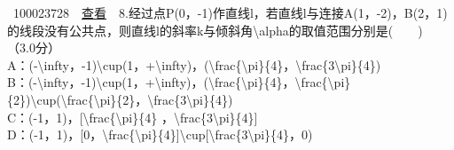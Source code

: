 \documentclass[]{article}
\begin{document}
~100023728~~\href{../question/viewQuestionDetail.jsp?questionID=100023728\&testPaperId=100229072}{查看}~~8.经过点P(0，-1)作直线l，若直线l与连接A(1，-2)，B(2，1)的线段没有公共点，则直线l的斜率k与倾斜角\textbackslash{}alpha的取值范围分别是(　　)\\
\hspace*{0.333em}\hspace*{0.333em}（3.0分）\\
\hspace*{0.333em}\hspace*{0.333em}\hspace*{0.333em}\hspace*{0.333em}\hspace*{0.333em}\hspace*{0.333em}\hspace*{0.333em}\hspace*{0.333em}A：(-\textbackslash{}infty，-1)\textbackslash{}cup(1，+\textbackslash{}infty)，(\textbackslash{}frac\{\textbackslash{}pi\}\{4\}，\textbackslash{}frac\{3\textbackslash{}pi\}\{4\})\\[2\baselineskip]\hspace*{0.333em}\hspace*{0.333em}\hspace*{0.333em}\hspace*{0.333em}\hspace*{0.333em}\hspace*{0.333em}\hspace*{0.333em}\hspace*{0.333em}B：(-\textbackslash{}infty，-1)\textbackslash{}cup(1，+\textbackslash{}infty)，(\textbackslash{}frac\{\textbackslash{}pi\}\{4\}，\textbackslash{}frac\{\textbackslash{}pi\}\{2\})\textbackslash{}cup(\textbackslash{}frac\{\textbackslash{}pi\}\{2\}，\textbackslash{}frac\{3\textbackslash{}pi\}\{4\})\\[2\baselineskip]\hspace*{0.333em}\hspace*{0.333em}\hspace*{0.333em}\hspace*{0.333em}\hspace*{0.333em}\hspace*{0.333em}\hspace*{0.333em}\hspace*{0.333em}C：(-1，1)，{[}\textbackslash{}frac\{\textbackslash{}pi\}\{4\}
，\textbackslash{}frac\{3\textbackslash{}pi\}\{4\}{]}\\[2\baselineskip]\hspace*{0.333em}\hspace*{0.333em}\hspace*{0.333em}\hspace*{0.333em}\hspace*{0.333em}\hspace*{0.333em}\hspace*{0.333em}\hspace*{0.333em}D：(-1，1)，{[}0，\textbackslash{}frac\{\textbackslash{}pi\}\{4\}{]}\textbackslash{}cup{[}\textbackslash{}frac\{3\textbackslash{}pi\}\{4\}，0)
\end{document}
